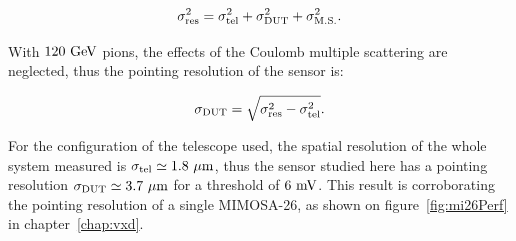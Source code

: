       \begin{equation}
        \sigma_{\rm{res}}^2 = \sigma_{\rm{tel}}^2 + \sigma_{\rm{DUT}}^2 + \sigma_{\rm{M.S.}}^2.
        \label{eq:pointingResolution}
      \end{equation}

      With $120~\rm{GeV}$ pions, the effects of the Coulomb multiple scattering are neglected, thus the pointing resolution of the sensor is:

      \begin{equation}
        \sigma_{\rm{DUT}} = \sqrt{\sigma_{\rm{res}}^2 - \sigma_{\rm{tel}}^2}.
      \end{equation}

      For the configuration of the telescope used, the spatial resolution of the whole system measured is $\sigma_{\rm{tel}} \simeq 1.8~\rm{\mu m}$, thus the sensor studied here has a pointing resolution $\sigma_{\rm{DUT}} \simeq 3.7~\rm{\mu m}$ for a threshold of $6~\rm{mV}$.
      This result is corroborating the pointing resolution of a single MIMOSA-26, as shown on figure~\ref{fig:mi26Perf} in chapter~\ref{chap:vxd}.

